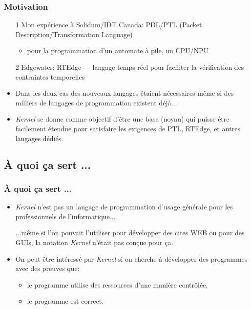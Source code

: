 \documentclass{beamer}
\newcommand{\mypause}{\pause}
\newcommand{\Kernel}{\textit{Kernel}}
\begin{document}
\begin{frame}
  \frametitle{Motivation}
  \begin{itemize}
  \item[1] Mon expérience à Solidum/IDT Canada: PDL/PTL (Packet Description/Transformation Language)
    \begin{itemize}
    \item pour la programmation d'un automate à pile, un CPU/NPU
    \end{itemize} \mypause
  \item[2] Edgewater: RTEdge --- langage temps réel pour faciliter la vérification des contraintes temporelles 
    \mypause
  \item Dans les deux cas des nouveaux langages étaient nécessaires
    même si des milliers de langages de programmation existent déjà...
    \mypause
  \item \Kernel{} se donne comme objectif d'être une base (noyau) qui
    puisse être facilement étendue pour satisfaire les exigences de
    PTL, RTEdge, et autres langages dédiés.
  \end{itemize}
\end{frame}

\subsection{À quoi ça sert ...}

\begin{frame}
  \frametitle{À quoi ça sert ...}
  \begin{itemize}
  \item \Kernel{} n'est pas un langage de programmation d'usage
    générale pour les professionnels de l'informatique...

    {\small\color{gray} ...même si l'on pouvait l'utiliser pour
      développer des cites WEB ou pour des GUIs, la notation \Kernel{}
      n'était pas conçue pour ça.}


\mypause
\item On peut être intéressé par \Kernel{} si on cherche à développer
  des programmes avec des \alert{preuves} que: 
    \begin{itemize}
    \item le programme utilise des ressources d'une manière contrôlée,
    \item le programme est \alert{correct}.
    \end{itemize}

  \end{itemize}
\end{frame}
\end{document}
